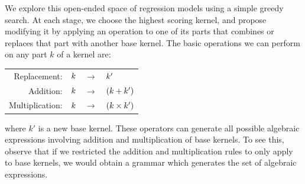 We explore this open-ended space of regression models using a simple greedy search.
At each stage, we choose the highest scoring kernel, and propose modifying it by applying an operation to one of its parts that combines or replaces that part with another base kernel.
The basic operations we can perform on any part $k$ of a kernel are:
%
\begin{center}
\begin{tabular}{rccl}
\textnormal{Replacement:}    & $k$ & $\to$ & $k'$\\
\textnormal{Addition:}       & $k$ & $\to$ & $(k + k')$\\
\textnormal{Multiplication:} & $k$ &  $\to$ & $(k \times k')$\\
\end{tabular}
\end{center}
%
where $k'$ is a new base kernel.
These operators can generate all possible algebraic expressions involving addition and multiplication of base kernels.
To see this, observe that if we restricted the addition and multiplication rules to only apply to base kernels, we would obtain a grammar which generates the set of algebraic expressions.

